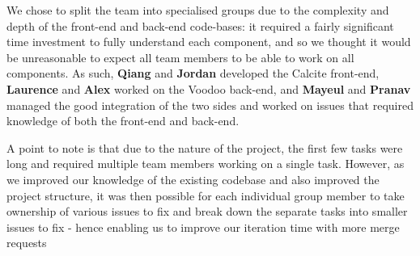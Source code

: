 We chose to split the team into specialised groups due to the complexity and depth of the front-end and back-end code-bases: it required a fairly significant time investment to fully understand each component, and so we thought it would be unreasonable to expect all team members to be able to work on all components. As such, \textbf{Qiang} and \textbf{Jordan} developed the Calcite front-end, \textbf{Laurence} and \textbf{Alex} worked on the Voodoo back-end, and \textbf{Mayeul} and \textbf{Pranav} managed the good integration of the two sides and worked on issues that required knowledge of both the front-end and back-end.

A point to note is that due to the nature of the project, the first few tasks were long and required multiple team members working on a single task. However, as we improved our knowledge of the existing codebase and also improved the project structure, it was then possible for each individual group member to take ownership of various issues to fix and break down the separate tasks into smaller issues to fix - hence enabling us to improve our iteration time with more merge requests 
